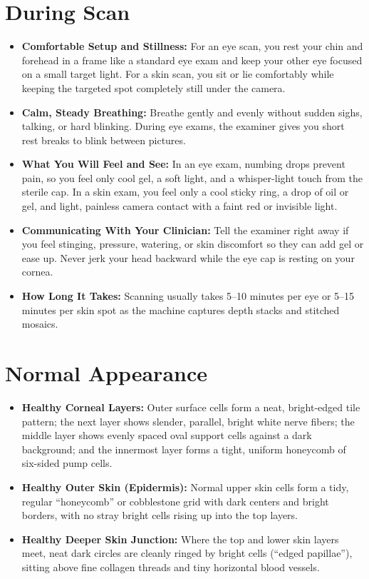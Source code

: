 \section{During Scan}
\begin{itemize}
    \item \textbf{Comfortable Setup and Stillness:} For an eye scan, you rest your chin and forehead in a frame like a standard eye exam and keep your other eye focused on a small target light. For a skin scan, you sit or lie comfortably while keeping the targeted spot completely still under the camera.
    \item \textbf{Calm, Steady Breathing:} Breathe gently and evenly without sudden sighs, talking, or hard blinking. During eye exams, the examiner gives you short rest breaks to blink between pictures.
    \item \textbf{What You Will Feel and See:} In an eye exam, numbing drops prevent pain, so you feel only cool gel, a soft light, and a whisper-light touch from the sterile cap. In a skin exam, you feel only a cool sticky ring, a drop of oil or gel, and light, painless camera contact with a faint red or invisible light.
    \item \textbf{Communicating With Your Clinician:} Tell the examiner right away if you feel stinging, pressure, watering, or skin discomfort so they can add gel or ease up. Never jerk your head backward while the eye cap is resting on your cornea.
    \item \textbf{How Long It Takes:} Scanning usually takes 5--10 minutes per eye or 5--15 minutes per skin spot as the machine captures depth stacks and stitched mosaics.
\end{itemize}

\section{Normal Appearance}
\begin{itemize}
    \item \textbf{Healthy Corneal Layers:} Outer surface cells form a neat, bright-edged tile pattern; the next layer shows slender, parallel, bright white nerve fibers; the middle layer shows evenly spaced oval support cells against a dark background; and the innermost layer forms a tight, uniform honeycomb of six-sided pump cells.
    \item \textbf{Healthy Outer Skin (Epidermis):} Normal upper skin cells form a tidy, regular ``honeycomb'' or cobblestone grid with dark centers and bright borders, with no stray bright cells rising up into the top layers.
    \item \textbf{Healthy Deeper Skin Junction:} Where the top and lower skin layers meet, neat dark circles are cleanly ringed by bright cells (``edged papillae''), sitting above fine collagen threads and tiny horizontal blood vessels.
\end{itemize}

